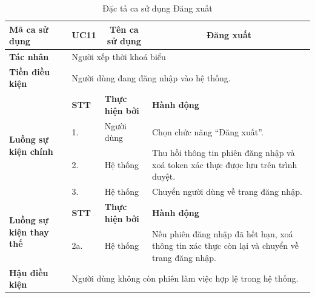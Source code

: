 \documentclass[../DoAn.tex]{subfiles}
\begin{document}
\begin{longtable}{|p{2.8cm}|p{1cm}|p{2.8cm}|p{6.3cm}|}
\caption{Đặc tả ca sử dụng Đăng xuất}
\label{tab:app_uc_dang_xuat} \\
\hline
\multicolumn{1}{|l|}{\textbf{Mã ca sử dụng}} & \multicolumn{1}{c|}{UC11} &
\multicolumn{1}{c|}{\textbf{Tên ca sử dụng}} & \multicolumn{1}{c|}{Đăng xuất} \\
\hline
\multicolumn{1}{|l|}{\textbf{Tác nhân}} & \multicolumn{3}{l|}{Người xếp thời khoá biểu} \\
\hline
\multicolumn{1}{|l|}{\textbf{Tiền điều kiện}} & \multicolumn{3}{l|}{Người dùng đang đăng nhập vào hệ thống.} \\
\hline
\multirow{4}{2.8cm}{\textbf{Luồng sự kiện chính}} & \textbf{STT} & \textbf{Thực hiện bởi} & \textbf{Hành động} \\
\cline{2-4}
& 1. & Người dùng & Chọn chức năng ``Đăng xuất''. \\
\cline{2-4}
& 2. & Hệ thống & Thu hồi thông tin phiên đăng nhập và xoá token xác thực được lưu trên trình duyệt. \\
\cline{2-4}
& 3. & Hệ thống & Chuyển người dùng về trang đăng nhập. \\
\hline
\multirow{2}{2.8cm}{\textbf{Luồng sự kiện thay thế}} & \textbf{STT} & \textbf{Thực hiện bởi} & \textbf{Hành động} \\
\cline{2-4}
& 2a. & Hệ thống & Nếu phiên đăng nhập đã hết hạn, xoá thông tin xác thực còn lại và chuyển về trang đăng nhập. \\
\hline
\multicolumn{1}{|l|}{\textbf{Hậu điều kiện}} & \multicolumn{3}{l|}{Người dùng không còn phiên làm việc hợp lệ trong hệ thống.} \\
\hline
\end{longtable}
\end{document}
